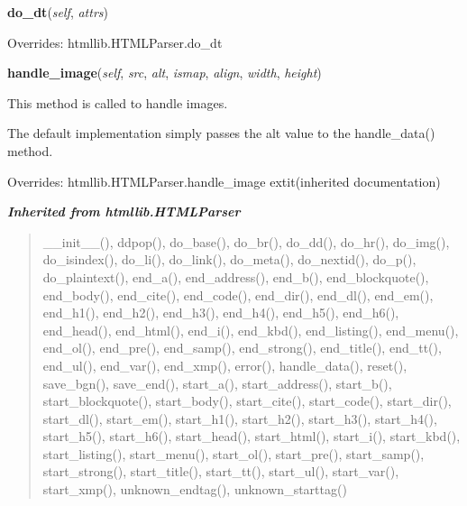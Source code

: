     \vspace{0.5ex}

\hspace{.8\funcindent}\begin{boxedminipage}{\funcwidth}

    \raggedright \textbf{do\_dt}(\textit{self}, \textit{attrs})

\setlength{\parskip}{2ex}
\setlength{\parskip}{1ex}
      Overrides: htmllib.HTMLParser.do\_dt

    \end{boxedminipage}

    \vspace{0.5ex}

\hspace{.8\funcindent}\begin{boxedminipage}{\funcwidth}

    \raggedright \textbf{handle\_image}(\textit{self}, \textit{src}, \textit{alt}, \textit{ismap}, \textit{align}, \textit{width}, \textit{height})

\setlength{\parskip}{2ex}
    This method is called to handle images.

    The default implementation simply passes the alt value to the 
    handle\_data() method.

\setlength{\parskip}{1ex}
      Overrides: htmllib.HTMLParser.handle\_image 	extit{(inherited documentation)}

    \end{boxedminipage}


\large{\textbf{\textit{Inherited from htmllib.HTMLParser}}}

\begin{quote}
\_\_init\_\_(), ddpop(), do\_base(), do\_br(), do\_dd(), do\_hr(), do\_img(), do\_isindex(), do\_li(), do\_link(), do\_meta(), do\_nextid(), do\_p(), do\_plaintext(), end\_a(), end\_address(), end\_b(), end\_blockquote(), end\_body(), end\_cite(), end\_code(), end\_dir(), end\_dl(), end\_em(), end\_h1(), end\_h2(), end\_h3(), end\_h4(), end\_h5(), end\_h6(), end\_head(), end\_html(), end\_i(), end\_kbd(), end\_listing(), end\_menu(), end\_ol(), end\_pre(), end\_samp(), end\_strong(), end\_title(), end\_tt(), end\_ul(), end\_var(), end\_xmp(), error(), handle\_data(), reset(), save\_bgn(), save\_end(), start\_a(), start\_address(), start\_b(), start\_blockquote(), start\_body(), start\_cite(), start\_code(), start\_dir(), start\_dl(), start\_em(), start\_h1(), start\_h2(), start\_h3(), start\_h4(), start\_h5(), start\_h6(), start\_head(), start\_html(), start\_i(), start\_kbd(), start\_listing(), start\_menu(), start\_ol(), start\_pre(), start\_samp(), start\_strong(), start\_title(), start\_tt(), start\_ul(), start\_var(), start\_xmp(), unknown\_endtag(), unknown\_starttag()
\end{quote}

